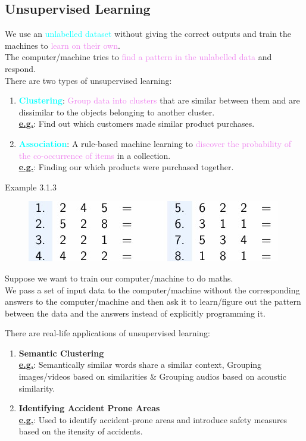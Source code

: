 \documentclass{book}
\begin{document}
\subsection{Unsupervised Learning}
We use an \textcolor{cyan}{unlabelled dataset} without giving the correct outputs and train the machines to \textcolor{violet}{learn on their own}.\\
The computer/machine tries to \textcolor{violet}{find a pattern in the unlabelled data} and respond.\\
There are two types of unsupervised learning:
\begin{enumerate}
    \item \textcolor{cyan}{\textbf{Clustering}}: \textcolor{violet}{Group data into clusters} that are similar between them and are dissimilar to the objects belonging to another cluster.\\
    \underline{\textbf{e.g.}}: Find out which customers made similar product purchases.
    \item \textcolor{cyan}{\textbf{Association}}: A rule-based machine learning to \textcolor{violet}{discover the probability of the co-occurrence of items} in a collection.\\
    \underline{\textbf{e.g.}}: Finding our which products were purchased together.
\end{enumerate}
\begin{egBox}{Example 3.1.3}{}
    \begin{figure}
        \centering
        \includegraphics[scale=0.45]{chapter 3/ch3_figure2.jpeg}
    \end{figure}
    \raggedright
    Suppose we want to train our computer/machine to do maths.\\
    We pass a set of input data to the computer/machine without the corresponding answers to the computer/machine and then ask it to learn/figure out the pattern between the data and the answers instead of explicitly programming it.\\
\end{egBox}
There are real-life applications of unsupervised learning:
\begin{enumerate}
    \item \textbf{Semantic Clustering}\\
    \underline{\textbf{e.g.}}: Semantically similar words share a similar context, Grouping images/videos based on similarities \& Grouping audios based on acoustic similarity.
    \item \textbf{Identifying Accident Prone Areas}\\
    \underline{\textbf{e.g.}}: Used to identify accident-prone areas and introduce safety measures based on the itensity of accidents.
\end{enumerate}
\end{document}

